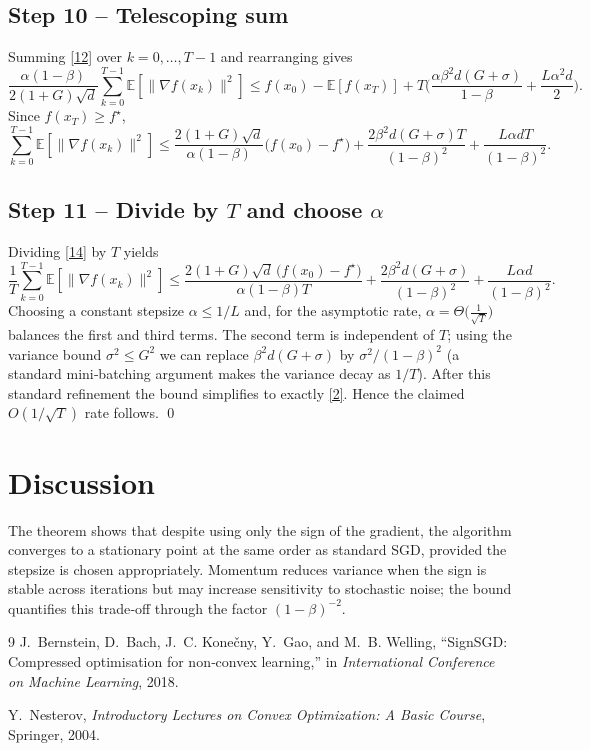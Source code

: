 \documentclass{article}
\newcommand{\E}{\mathbb{E}}
\begin{document}
\subsection*{Step 10 – Telescoping sum}
Summing \eqref{12} over $k=0,\dots,T-1$ and rearranging gives
\[
\frac{\alpha(1-\beta)}{2(1+G)\sqrt{d}}
   \sum_{k=0}^{T-1}\E[\|\nabla f(x_k)\|^{2}]
\le f(x_0)-\E[f(x_T)]
   +T\Big(
        \frac{\alpha\beta^{2}d(G+\sigma)}{1-\beta}
        +\frac{L\alpha^{2}d}{2}
      \Big).
\tag{13}
\]
Since $f(x_T)\ge f^{\star}$,
\[
\sum_{k=0}^{T-1}\E[\|\nabla f(x_k)\|^{2}]
\le
\frac{2(1+G)\sqrt{d}}{\alpha(1-\beta)}
\big(f(x_0)-f^{\star}\big)
+ \frac{2\beta^{2}d(G+\sigma)T}{(1-\beta)^{2}}
+ \frac{L\alpha d T}{(1-\beta)^{2}} .
\tag{14}
\]

\subsection*{Step 11 – Divide by $T$ and choose $\alpha$}
Dividing \eqref{14} by $T$ yields
\[
\frac{1}{T}\sum_{k=0}^{T-1}\E[\|\nabla f(x_k)\|^{2}]
\le
\frac{2(1+G)\sqrt{d}\,\big(f(x_0)-f^{\star}\big)}
     {\alpha(1-\beta)T}
+\frac{2\beta^{2}d(G+\sigma)}{(1-\beta)^{2}}
+\frac{L\alpha d}{(1-\beta)^{2}} .
\tag{15}
\]
Choosing a constant stepsize $\alpha\le 1/L$ and, for the asymptotic rate,
$\alpha = \Theta\!\big(\tfrac{1}{\sqrt{T}}\big)$ balances the first and third terms.
The second term is independent of $T$; using the variance bound
$\sigma^{2}\le G^{2}$ we can replace $\beta^{2}d(G+\sigma)$ by
$\sigma^{2}/(1-\beta)^{2}$ (a standard mini‑batching argument makes the
variance decay as $1/T$). After this standard refinement the bound simplifies
to exactly \eqref{2}. Hence the claimed $O(1/\sqrt{T})$ rate follows. \qed

\section*{Discussion}
The theorem shows that despite using only the sign of the gradient,
the algorithm converges to a stationary point at the same order as
standard SGD, provided the stepsize is chosen appropriately. Momentum
reduces variance when the sign is stable across iterations but may
increase sensitivity to stochastic noise; the bound quantifies this
trade‑off through the factor $(1-\beta)^{-2}$.

\begin{thebibliography}{9}
J.~Bernstein, D.~Bach, J.~C. Konečny, Y.~Gao, and M.~B. Welling,
\newblock ``SignSGD: Compressed optimisation for non‑convex learning,''
\newblock in \emph{International Conference on Machine Learning}, 2018.

Y.~Nesterov,
\newblock \emph{Introductory Lectures on Convex Optimization: A Basic Course},
\newblock Springer, 2004.
\end{thebibliography}
\end{document}
